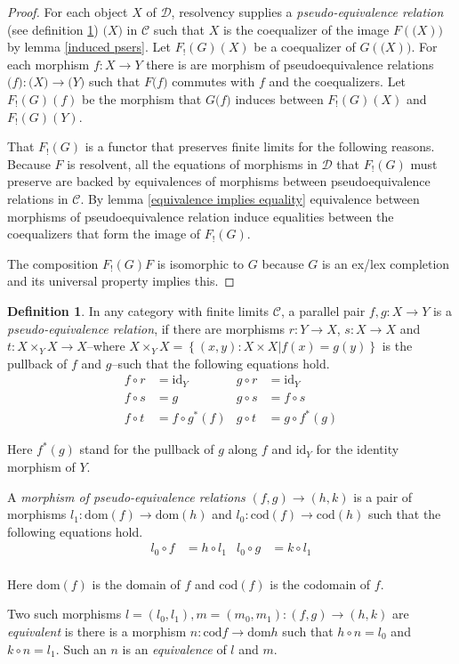 \documentclass[sort&compress,draft]{elsarticle}
\theoremstyle{plain}
\theoremstyle{definition}
\newtheorem{definition}[theorem]{Definition}
\theoremstyle{remark}
\newcommand\key[1]{\emph{#1}\label{#1}}
\newcommand\cat\mathcal
\newcommand\set[1]{\left\{#1\right\}}
\newcommand\of:
\newcommand\ri{^*}
\newcommand\id{\mathrm{id}}
\newcommand\dom{\mathrm{dom}}
\newcommand\cod{\mathrm{cod}}
\newcommand\di{_!}
\begin{document}
\newcommand\pser\mathbf
\begin{proof} For each object $X$ of $\cat D$, resolvency supplies a \emph{pseudo-equivalence relation} (see definition \ref{pseudo-equivalence relation}) $\pser(X)$ in $\cat C$ such that $X$ is the coequalizer of the image $F(\pser(X))$ by lemma \ref{induced psers}. Let $F\di(G)(X)$ be a coequalizer of $G(\pser(X))$. For each morphism $f\of X\to Y$ there is are morphism of pseudoequivalence relations $\pser(f)\of\pser(X)\to\pser(Y)$ such that $F\pser(f)$ commutes with $f$ and the coequalizers. Let $F\di(G)(f)$ be the morphism that $G\pser(f)$ induces between $F\di(G)(X)$ and $F\di(G)(Y)$.

That $F\di(G)$ is a functor that preserves finite limits for the following reasons. Because $F$ is resolvent, all the equations of morphisms in $\cat D$ that $F\di(G)$ must preserve are backed by equivalences of morphisms between pseudoequivalence relations in $\cat C$. By lemma \ref{equivalence implies equality} equivalence between morphisms of pseudoequivalence relation induce equalities between the coequalizers that form the image of $F\di(G)$.

The composition $F\di(G)F$ is isomorphic to $G$ because $G$ is an ex/lex completion and its universal property implies this.
\end{proof}


\begin{definition} In any category with finite limits $\cat C$, a parallel pair $f,g\of X\to Y$ is a \key{pseudo-equivalence relation}, if there are morphisms $r:Y\to X$, $s:X\to X$ and $t:X\times_YX \to X$--where $X\times_YX = \set{(x,y)\of X\times X|f(x)=g(y)}$ is the pullback of $f$ and $g$--such that the following equations hold.
\begin{align*}
f\circ r &=\id_Y & g\circ r &= \id_Y\\
f\circ s &= g & g\circ s &= f\circ s\\
f\circ t &= f\circ g\ri(f) & g\circ t &= g\circ f\ri(g)
\end{align*}

Here $f\ri(g)$ stand for the pullback of $g$ along $f$ and $\id_Y$ for the identity morphism of $Y$.

A \emph{morphism of pseudo-equivalence relations} $(f,g) \to (h,k)$ is a pair of morphisms $l_1\of \dom(f) \to \dom(h)$ and $l_0\of \cod(f) \to \cod(h)$ such that the following equations hold.
\begin{align*}
l_0\circ f &= h\circ l_1 & l_0\circ g &= k\circ l_1\\
\end{align*}

Here $\dom(f)$ is the domain of $f$ and $\cod(f)$ is the codomain of $f$.

Two such morphisms $l=(l_0,l_1),m=(m_0,m_1):(f,g) \to (h,k)$ are \emph{equivalent} is there is a morphism $n\of \cod f \to \dom h$ such that $h\circ n = l_0$ and $k\circ n = l_1$. Such an $n$ is an \emph{equivalence} of $l$ and $m$.
\end{definition}
\end{document}

